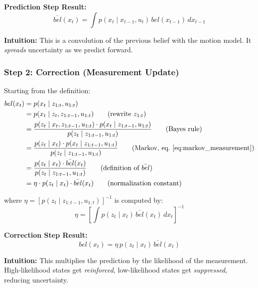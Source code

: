 \begin{tcolorbox}[colback=blue!10!white,colframe=blue!75!black]
\textbf{Prediction Step Result:}
\begin{equation}
\boxed{\bar{bel}(x_t) = \int p(x_t \mid x_{t-1}, u_t) \, bel(x_{t-1}) \, dx_{t-1}}
\label{eq:prediction_step}
\end{equation}

\textbf{Intuition:} This is a convolution of the previous belief with the motion model. It \textit{spreads} uncertainty as we predict forward.
\end{tcolorbox}

\subsubsection{Step 2: Correction (Measurement Update)}

Starting from the definition:
\begin{align}
bel(x_t) &= p(x_t \mid z_{1:t}, u_{1:t}) \\
%
&= p(x_t \mid z_t, z_{1:t-1}, u_{1:t}) 
\tag{rewrite $z_{1:t}$} \\
%
&= \frac{p(z_t \mid x_t, z_{1:t-1}, u_{1:t}) \cdot p(x_t \mid z_{1:t-1}, u_{1:t})}{p(z_t \mid z_{1:t-1}, u_{1:t})} 
\tag{Bayes rule} \\
%
&= \frac{p(z_t \mid x_t) \cdot p(x_t \mid z_{1:t-1}, u_{1:t})}{p(z_t \mid z_{1:t-1}, u_{1:t})} 
\tag{Markov, eq.~\ref{eq:markov_measurement}} \\
%
&= \frac{p(z_t \mid x_t) \cdot \bar{bel}(x_t)}{p(z_t \mid z_{1:t-1}, u_{1:t})} 
\tag{definition of $\bar{bel}$} \\
%
&= \eta \cdot p(z_t \mid x_t) \cdot \bar{bel}(x_t)
\tag{normalization constant}
\end{align}

where $\eta = \left[p(z_t \mid z_{1:t-1}, u_{1:t})\right]^{-1}$ is computed by:
\begin{equation}
\eta = \left[\int p(z_t \mid x_t) \, \bar{bel}(x_t) \, dx_t \right]^{-1}
\end{equation}

\begin{tcolorbox}[colback=blue!10!white,colframe=blue!75!black]
\textbf{Correction Step Result:}
\begin{equation}
\boxed{bel(x_t) = \eta \, p(z_t \mid x_t) \, \bar{bel}(x_t)}
\label{eq:correction_step}
\end{equation}

\textbf{Intuition:} This multiplies the prediction by the likelihood of the measurement. High-likelihood states get \textit{reinforced}, low-likelihood states get \textit{suppressed}, reducing uncertainty.
\end{tcolorbox}


